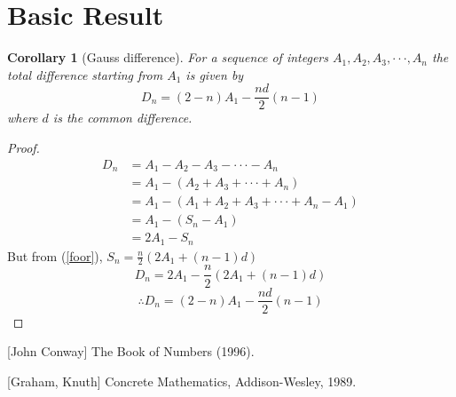 \documentclass[12pt]{article}
\newtheorem{cor}[thm]{Corollary}
\theoremstyle{definition}
\theoremstyle{remark}
\begin{document}
\section{Basic Result}

\begin{cor}[Gauss difference] For a sequence of integers $A_1,A_2,A_3,\cdot\cdot\cdot ,A_n$ the total difference starting from $A_1$ is given by
\[D_n=(2-n) A_1-\frac{nd}{2}(n-1)\]
where $d$ is the common difference.
\end{cor}

\begin{proof}
\begin{align*}
D_n &=A_1-A_2-A_3- \cdot\cdot\cdot -A_n\\
    &= A_1-(A_2+A_3+ \cdot\cdot\cdot +A_n)\\
    &= A_1-(A_1+A_2+A_3+ \cdot\cdot\cdot +A_n-A_1)\\
    &= A_1-(S_n-A_1)\\
    &= 2A_1-S_n
\end{align*}
But from (\ref{foor}), $S_n=\frac{n}{2}(2A_1 +(n-1)d)$
\[
D_n =2A_1-\frac{n}{2}(2A_1 +(n-1)d)
\]
\[\therefore D_n=(2-n) A_1-\frac{nd}{2}(n-1)\]
\end{proof}
\begin{thebibliography}{9}

[John Conway]
The Book of Numbers (1996).

[Graham, Knuth]
Concrete Mathematics, Addison-Wesley, 1989.

\end{thebibliography}
\end{document}
